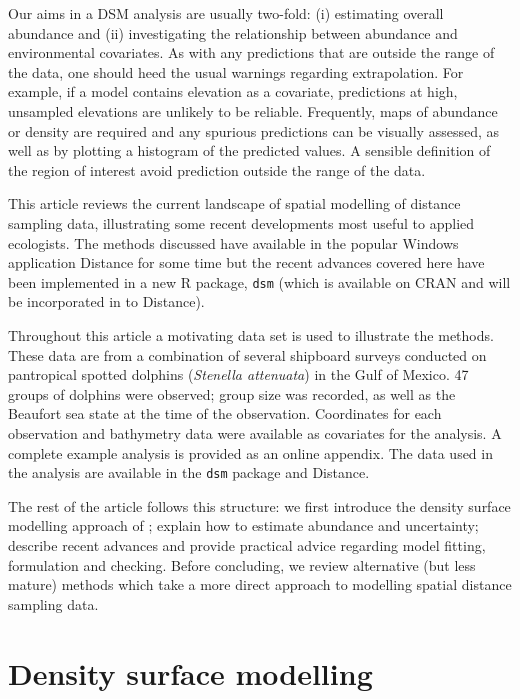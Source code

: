 \documentclass[a4paper,12pt]{article}
\begin{document}
Our aims in a DSM analysis are usually two-fold: (i) estimating overall abundance and (ii) investigating the relationship between abundance and environmental covariates. As with any predictions that are outside the range of the data, one should heed the usual warnings regarding extrapolation. For example, if a model contains elevation as a covariate, predictions at high, unsampled elevations are unlikely to be reliable. Frequently, maps of abundance or density are required and any spurious predictions can be visually assessed, as well as by plotting a histogram of the predicted values. A sensible definition of the region of interest avoid prediction outside the range of the data.

This article reviews the current landscape of spatial modelling of distance sampling data, illustrating some recent developments most useful to applied ecologists. The methods discussed have available in the popular Windows application Distance \citep{Thomas:2010cf} for some time but the recent advances covered here have been implemented in a new \textsf{R} package, \texttt{dsm} (which is available on CRAN and will be incorporated in to Distance).

Throughout this article a motivating data set is used to illustrate the methods. These data are from a combination of several shipboard surveys conducted on pantropical spotted dolphins (\textit{Stenella attenuata}) in the Gulf of Mexico. 47 groups of dolphins were observed; group size was recorded, as well as the Beaufort sea state at the time of the observation. Coordinates for each observation and bathymetry data were available as covariates for the analysis. A complete example analysis is provided as an online appendix. The data used in the analysis are available in the \texttt{dsm} package and Distance.

The rest of the article follows this structure: we first introduce the density surface modelling approach of \cite{Hedley:2004et}; explain how to estimate abundance and uncertainty; describe recent advances and provide practical advice regarding model fitting, formulation and checking. Before concluding, we review alternative (but less mature) methods which take a more direct approach to modelling spatial distance sampling data.


\section*{Density surface modelling}
\label{s:dsm}
\end{document}
